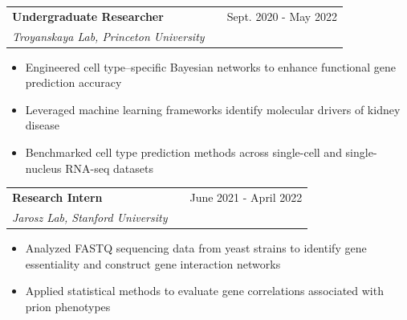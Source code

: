 \documentclass[a4paper,12pt]{article}
\makeatletter
\newenvironment{joblong}[3]
    {
    \begin{tabularx}{\linewidth}{@{}l X r@{}}
    \textbf{#1} & \hfill &  #2 \\
    \textit{#3} & & \\[3.75pt]  
    \end{tabularx}
    \begin{minipage}[t]{\linewidth}
    \begin{itemize}[nosep,after=\strut, leftmargin=1em, itemsep=2.5pt,label=\scriptsize$\bullet$]
    }
    {
    \end{itemize}
    \end{minipage}    
    }
\makeatother
\begin{document}
\begin{joblong}{Undergraduate Researcher}{Sept. 2020 - May 2022}{Troyanskaya Lab, Princeton University}
\item Engineered cell type–specific Bayesian networks to enhance functional gene prediction accuracy
\item Leveraged machine learning frameworks identify  molecular drivers of kidney disease
\item Benchmarked cell type prediction methods across single-cell and single-nucleus RNA-seq datasets 
\end{joblong}



\begin{joblong}{Research Intern}{June 2021 - April 2022}{Jarosz Lab, Stanford University}
\item Analyzed FASTQ sequencing data from yeast strains to identify gene essentiality and construct gene interaction networks
\item Applied statistical methods to evaluate gene correlations associated with prion phenotypes
\end{joblong}

\end{document}
